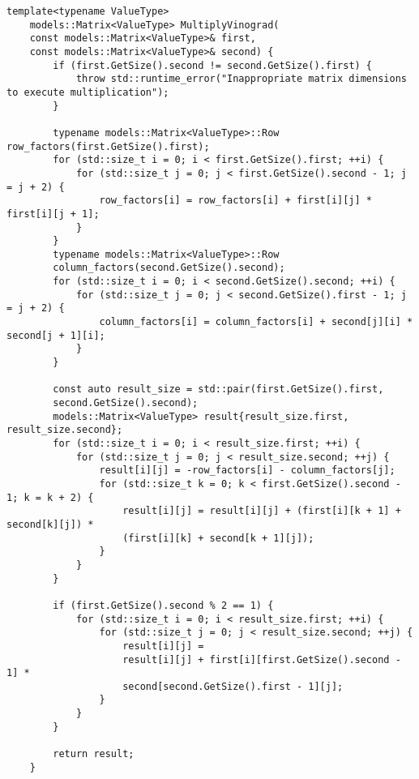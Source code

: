 \begin{lstlisting}[caption=Функция алгоритма Винограда умножения матриц]
	template<typename ValueType>
	models::Matrix<ValueType> MultiplyVinograd(
	const models::Matrix<ValueType>& first,
	const models::Matrix<ValueType>& second) {
		if (first.GetSize().second != second.GetSize().first) {
			throw std::runtime_error("Inappropriate matrix dimensions to execute multiplication");
		}
		
		typename models::Matrix<ValueType>::Row row_factors(first.GetSize().first);
		for (std::size_t i = 0; i < first.GetSize().first; ++i) {
			for (std::size_t j = 0; j < first.GetSize().second - 1; j = j + 2) {
				row_factors[i] = row_factors[i] + first[i][j] * first[i][j + 1];
			}
		}
		typename models::Matrix<ValueType>::Row
		column_factors(second.GetSize().second);
		for (std::size_t i = 0; i < second.GetSize().second; ++i) {
			for (std::size_t j = 0; j < second.GetSize().first - 1; j = j + 2) {
				column_factors[i] = column_factors[i] + second[j][i] * second[j + 1][i];
			}
		}
		
		const auto result_size = std::pair(first.GetSize().first,
		second.GetSize().second);
		models::Matrix<ValueType> result{result_size.first, result_size.second};
		for (std::size_t i = 0; i < result_size.first; ++i) {
			for (std::size_t j = 0; j < result_size.second; ++j) {
				result[i][j] = -row_factors[i] - column_factors[j];
				for (std::size_t k = 0; k < first.GetSize().second - 1; k = k + 2) {
					result[i][j] = result[i][j] + (first[i][k + 1] + second[k][j]) *
					(first[i][k] + second[k + 1][j]);
				}
			}
		}
		
		if (first.GetSize().second % 2 == 1) {
			for (std::size_t i = 0; i < result_size.first; ++i) {
				for (std::size_t j = 0; j < result_size.second; ++j) {
					result[i][j] =
					result[i][j] + first[i][first.GetSize().second - 1] *
					second[second.GetSize().first - 1][j];
				}
			}
		}
		
		return result;
	}
\end{lstlisting}

